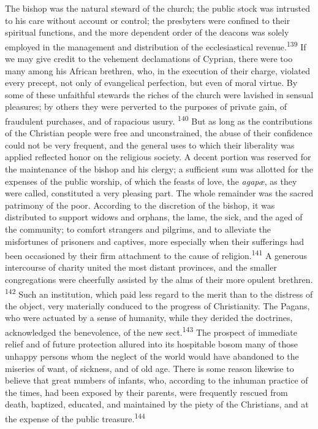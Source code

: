 
The bishop was the natural steward of the church; the public
stock was intrusted to his care without account or control; the
presbyters were confined to their spiritual functions, and the
more dependent order of the deacons was solely employed in the
management and distribution of the ecclesiastical revenue.\textsuperscript{139} If
we may give credit to the vehement declamations of Cyprian, there
were too many among his African brethren, who, in the execution
of their charge, violated every precept, not only of evangelical
perfection, but even of moral virtue. By some of these unfaithful
stewards the riches of the church were lavished in sensual
pleasures; by others they were perverted to the purposes of
private gain, of fraudulent purchases, and of rapacious usury. \textsuperscript{140}
But as long as the contributions of the Christian people were
free and unconstrained, the abuse of their confidence could not
be very frequent, and the general uses to which their liberality
was applied reflected honor on the religious society. A decent
portion was reserved for the maintenance of the bishop and his
clergy; a sufficient sum was allotted for the expenses of the
public worship, of which the feasts of love, the \textit{agapæ}, as they
were called, constituted a very pleasing part. The whole
remainder was the sacred patrimony of the poor. According to the
discretion of the bishop, it was distributed to support widows
and orphans, the lame, the sick, and the aged of the community;
to comfort strangers and pilgrims, and to alleviate the
misfortunes of prisoners and captives, more especially when their
sufferings had been occasioned by their firm attachment to the
cause of religion.\textsuperscript{141} A generous intercourse of charity united
the most distant provinces, and the smaller congregations were
cheerfully assisted by the alms of their more opulent brethren. \textsuperscript{142}
Such an institution, which paid less regard to the merit than
to the distress of the object, very materially conduced to the
progress of Christianity. The Pagans, who were actuated by a
sense of humanity, while they derided the doctrines, acknowledged
the benevolence, of the new sect.\textsuperscript{143} The prospect of immediate
relief and of future protection allured into its hospitable bosom
many of those unhappy persons whom the neglect of the world would
have abandoned to the miseries of want, of sickness, and of old
age. There is some reason likewise to believe that great numbers
of infants, who, according to the inhuman practice of the times,
had been exposed by their parents, were frequently rescued from
death, baptized, educated, and maintained by the piety of the
Christians, and at the expense of the public treasure.\textsuperscript{144}

